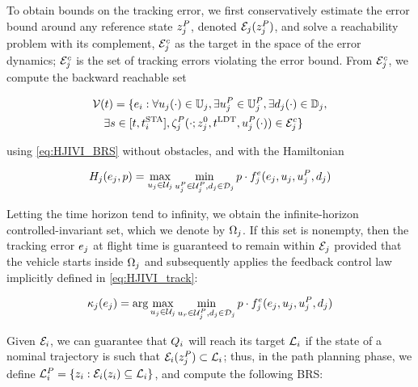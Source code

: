 To obtain bounds on the tracking error, we first conservatively estimate the error bound around any reference state $z_j^P$, denoted $\mathcal{E}_j(z_j^P)$, and solve a reachability problem with its complement, $\mathcal{E}_j^c$ as the target in the space of the error dynamics; $\mathcal{E}_j^c$ is the set of tracking errors violating the error bound. From $\mathcal{E}_j^c$, we compute the backward reachable set 

\begin{equation}
\label{eq:BRS_rtt}
\begin{aligned}
&\brs(t) = \{\errstate_i: \forall \ctrl_j(\cdot) \in \cfset_j, \exists \ctrl_j^P \in \cfset_j^P, \exists \dstb_j(\cdot) \in \dfset_j, \\
&\quad\exists s \in [t, \sta_i], \traj_j^P(\cdot; \state^0_j, \ldt, \ctrl_j^P(\cdot)) \in \errorbound_j^c\}
\end{aligned}
\end{equation}

\noindent using \eqref{eq:HJIVI_BRS} without obstacles, and with the Hamiltonian

\begin{equation}
\label{eq:HJIVI_track}
\ham_j(\errstate_j, \costate) = \max_{\ctrl_j \in \cset_j} \min_{\ctrl_j^P \in\cset^P_j, \dstb_j \in \dset_j} \costate \cdot \fdyn^\errstate_j(\errstate_j, \ctrl_j, \ctrl_j^P, \dstb_j)
\end{equation}

Letting the time horizon tend to infinity, we obtain the infinite-horizon controlled-invariant set, which we denote by $\Omega_j$. If this set is nonempty, then the tracking error $e_j$ at flight time is guaranteed to remain within $\mathcal{E}_j$ provided that the vehicle starts inside $\Omega_j$ and subsequently applies the feedback control law implicitly defined in \eqref{eq:HJIVI_track}:

\begin{equation}
\label{eq:robust_tracking_law}
\tracklaw_j(\errstate_j) = \arg\max_{\ctrl_j \in \cset_j} \min_{\ctrl_r \in\cset^P_j, \dstb_j \in \dset_j} \costate \cdot \fdyn^\errstate_j(\errstate_j, \ctrl_j, \ctrl_j^P, \dstb_j)
\end{equation}

Given $\mathcal{E}_i$, we can guarantee that $Q_{i}$ will reach its target $\mathcal{L}_i$ if the state of a nominal trajectory is such that $\mathcal{E}_i(z_j^P) \subset \mathcal{L}_i$; thus, in the path planning phase, we define $\mathcal{L}_i^P = \{z_i: \mathcal{E}_i(z_i) \subseteq \mathcal{L}_i\}$, and compute the following BRS: 

